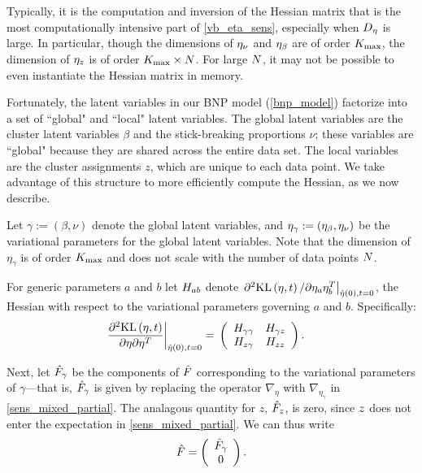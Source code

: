 Typically, it is the computation and inversion of the Hessian matrix that is
the most computationally intensive part of \eqref{vb_eta_sens}, especially when
${D_{\eta}}$ is large.
In particular, though the dimensions of $\eta_{\nu}$ and
$\eta_{\beta}$ are of order ${K_{\mathrm{max}}}$, the dimension of $\eta_{z}$ is of order ${K_{\mathrm{max}}}
\times N$.
For large $N$, it may not be possible to even instantiate the Hessian matrix in memory.

Fortunately, the latent variables in our BNP model (\eqref{bnp_model}) factorize
into a set of ``global" and ``local" latent variables.
The global latent variables are the cluster latent variables $\beta$ and
the stick-breaking proportions $\nu$;
these variables are ``global" because they are shared across the entire data set.
The local variables are the cluster assignments $z$, which are unique to each data point.
We take advantage of this structure to more efficiently compute the Hessian,
as we now describe.

Let $\gamma := (\beta, \nu)$ denote the global latent variables, and
$\eta_\gamma := (\eta_{\beta}, \eta_{\nu})$ be the variational parameters for the global latent variables.
Note that the dimension of $\eta_\gamma$ is of order ${K_{\mathrm{max}}}$ and does not scale with
the number of data points $N$.

For generic parameters $a$ and $b$
let $H_{ab}$ denote $\left.\partial^2 \mathrm{KL}\left(\eta, t\right) / \partial \eta_a
\eta_b^T\right|_{\hat\eta(0), t=0}$, the Hessian with respect to the variational
parameters governing $a$ and $b$.  Specifically:
%
\begin{align*}
%
\fracat{\partial^2 \KL{\eta, \t}}
       {\partial \eta \partial \eta^T}
       {\etaopt(0), t= 0} ={}&
\left(
\begin{array}{cc}
   \hess{\gamma\gamma} & \hess{\gamma\z} \\
   \hess{\z\gamma}     & \hess{\z\z} \\
\end{array}
\right).
%
\end{align*}

Next, let $\hat F_\gamma$ be the components of
$\hat F$ corresponding to the variational parameters of
$\gamma$---that is, $\hat F_\gamma$ is given by replacing
the operator $\nabla_\eta$ with $\nabla_{\eta_\gamma}$ in \eqref{sens_mixed_partial}.
The analagous quantity for $z$, $\hat F_z$, is zero, since $z$ does not enter the expectation in \eqref{sens_mixed_partial}.
We can thus write
\begin{align*}
  \hat F = \left( \begin{array}{c} \hat F_\gamma \\ 0 \end{array}\right).
\end{align*}

